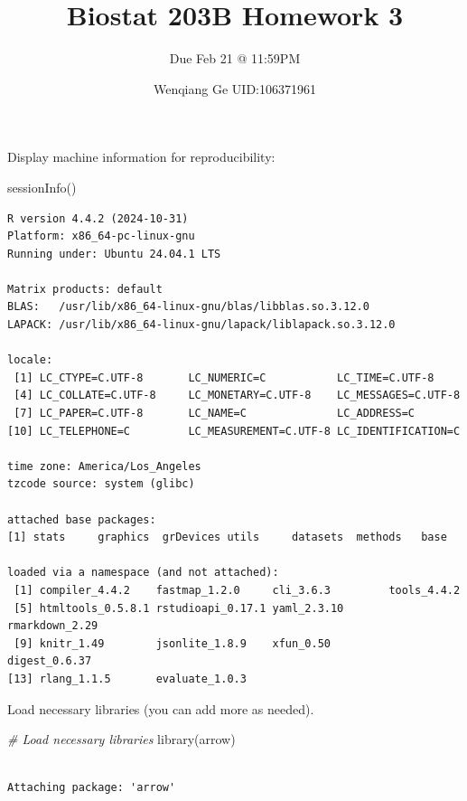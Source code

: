 \documentclass[
]{article}
\title{Biostat 203B Homework 3}
\subtitle{Due Feb 21 @ 11:59PM}
\author{Wenqiang Ge UID:106371961}
\date{}
\newenvironment{Shaded}{\begin{snugshade}}{\end{snugshade}}
\newcommand{\CommentTok}[1]{\textcolor[rgb]{0.56,0.35,0.01}{\textit{#1}}}
\newcommand{\FunctionTok}[1]{\textcolor[rgb]{0.00,0.00,0.00}{#1}}
\newcommand{\NormalTok}[1]{\textcolor[rgb]{0.00,0.00,0.00}{#1}}
\renewcommand*\contentsname{Table of contents}
\newcommand\contentsname{Table of contents}
\begin{document}
\maketitle
\renewcommand*\contentsname{Table of contents}
{
\hypersetup{linkcolor=}
\setcounter{tocdepth}{2}
\tableofcontents
}
Display machine information for reproducibility:

\begin{Shaded}
\begin{Highlighting}[]
\FunctionTok{sessionInfo}\NormalTok{()}
\end{Highlighting}
\end{Shaded}

\begin{verbatim}
R version 4.4.2 (2024-10-31)
Platform: x86_64-pc-linux-gnu
Running under: Ubuntu 24.04.1 LTS

Matrix products: default
BLAS:   /usr/lib/x86_64-linux-gnu/blas/libblas.so.3.12.0 
LAPACK: /usr/lib/x86_64-linux-gnu/lapack/liblapack.so.3.12.0

locale:
 [1] LC_CTYPE=C.UTF-8       LC_NUMERIC=C           LC_TIME=C.UTF-8       
 [4] LC_COLLATE=C.UTF-8     LC_MONETARY=C.UTF-8    LC_MESSAGES=C.UTF-8   
 [7] LC_PAPER=C.UTF-8       LC_NAME=C              LC_ADDRESS=C          
[10] LC_TELEPHONE=C         LC_MEASUREMENT=C.UTF-8 LC_IDENTIFICATION=C   

time zone: America/Los_Angeles
tzcode source: system (glibc)

attached base packages:
[1] stats     graphics  grDevices utils     datasets  methods   base     

loaded via a namespace (and not attached):
 [1] compiler_4.4.2    fastmap_1.2.0     cli_3.6.3         tools_4.4.2      
 [5] htmltools_0.5.8.1 rstudioapi_0.17.1 yaml_2.3.10       rmarkdown_2.29   
 [9] knitr_1.49        jsonlite_1.8.9    xfun_0.50         digest_0.6.37    
[13] rlang_1.1.5       evaluate_1.0.3   
\end{verbatim}

Load necessary libraries (you can add more as needed).

\begin{Shaded}
\begin{Highlighting}[]
\CommentTok{\# Load necessary libraries}
\FunctionTok{library}\NormalTok{(arrow)}
\end{Highlighting}
\end{Shaded}

\begin{verbatim}

Attaching package: 'arrow'
\end{verbatim}
\end{document}
